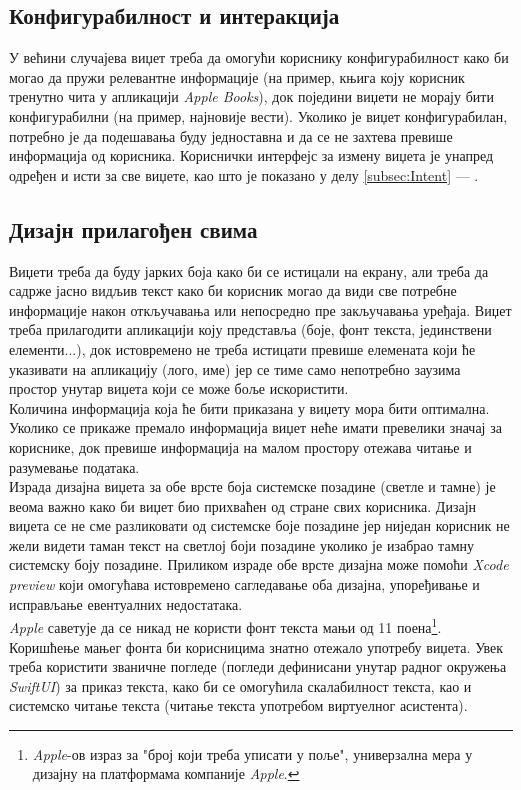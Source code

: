 \documentclass[12pt,oneside]{memoir}
\begin{document}
\subsection{Конфигурабилност и интеракција}
\indent У већини случајева виџет треба да омогући кориснику конфигурабилност како би могао да пружи релевантне информације (на пример, књига коју корисник тренутно чита у апликацији \textit{Apple Books}), док поједини виџети не морају бити конфигурабилни (на пример, најновије вести). Уколико је виџет конфигурабилан, потребно је да подешавања буду једноставна и да се не захтева превише информација од корисника. Кориснички интерфејс за измену виџета је унапред одређен и исти за све виџете, као што је показано у делу \ref{subsec:Intent} --- .

\subsection{Дизајн прилагођен свима}
\indent Виџети треба да буду јарких боја како би се истицали на екрану, али треба да садрже јасно видљив текст како би корисник могао да види све потребне информације након откључавања или непосредно пре закључавања уређаја. Виџет треба прилагодити апликацији коју представља (боје, фонт текста, јединствени елементи...), док истовремено не треба истицати превише елемената који ће указивати на апликацију (лого, име) јер се тиме само непотребно заузима простор унутар виџета који се може боље искористити.  
\\
\indent Количина информација која ће бити приказана у виџету мора бити оптимална. Уколико се прикаже премало информација виџет неће имати превелики значај за кориснике, док превише информација на малом простору отежава читање и разумевање података.
\\
\indent Израда дизајна виџета за обе врсте боја системске позадине (светле и тамне) је веома важно како би виџет био прихваћен од стране свих корисника. Дизајн виџета се не сме разликовати од системске боје позадине јер ниједан корисник не жели видети таман текст на светлој боји позадине уколико је изабрао тамну системску боју позадине. Приликом израде обе врсте дизајна може помоћи \textit{Xcode preview} који омогућава истовремено сагледавање оба дизајна, упоређивање и исправљање евентуалних недостатака.
\\
\indent \textit{Apple} саветује да се никад не користи фонт текста мањи од 11 поена\footnote{\textit{Apple}-ов израз за "број који треба уписати у поље", универзална мера у дизајну на платформама компаније \textit{Apple}.}. Коришћење мањег фонта би корисницима знатно отежало употребу виџета. Увек треба користити званичне погледе (погледи дефинисани унутар радног окружења \textit{SwiftUI}) за приказ текста, како би се омогућила скалабилност текста, као и системско читање текста (читање текста употребом виртуелног асистента).
\end{document}
